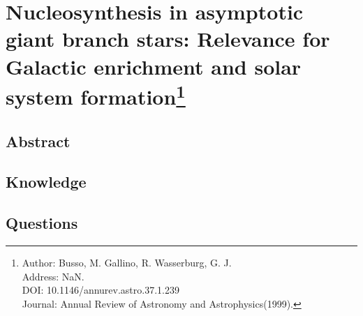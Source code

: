 \section[Nucleosynthesis in asymptotic giant branch stars: Relevance for Galactic enrichment and solar system formation]{Nucleosynthesis in asymptotic giant branch stars: Relevance for Galactic enrichment and solar system formation\protect\footnote{Author: Busso, M. Gallino, R. Wasserburg, G. J. \\Address: NaN. \\DOI: 10.1146/annurev.astro.37.1.239 \\Journal: Annual Review of Astronomy and Astrophysics(1999).}}
\subsection{Abstract}

\subsection{Knowledge}

\subsection{Questions}